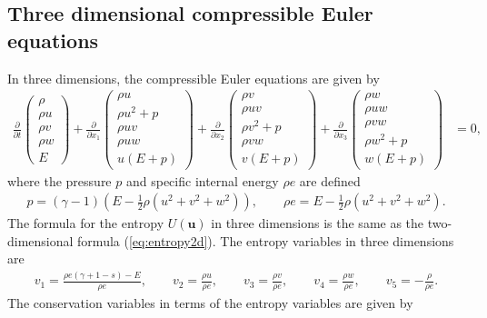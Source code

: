 \documentclass[10pt]{amsart}
\theoremstyle{definition}
\theoremstyle{lemma}
\theoremstyle{theorem}
\theoremstyle{assumption}
\newcommand{\pd}[2]{\frac{\partial#1}{\partial#2}}
\newcommand{\LRp}[1]{\left( #1 \right)}
\begin{document}
{\subsection{Three dimensional compressible Euler equations}

In three dimensions, the compressible Euler equations are given by
\begin{align}
\pd{}{t}\LRp{\begin{array}{c}
\rho\\
\rho u\\
\rho v\\
\rho w\\
E
\end{array}} +
\pd{}{x_1}\LRp{\begin{array}{c}
\rho u\\
\rho u^2+p\\
\rho uv\\
\rho uw\\
u(E+p)
\end{array}} + \pd{}{x_2}\LRp{\begin{array}{c}
\rho v\\
\rho uv\\
\rho v^2+p\\
\rho vw\\
v(E+p)
\end{array}}  + \pd{}{x_3}\LRp{\begin{array}{c}
\rho w\\
\rho uw\\
\rho vw\\
\rho w^2+p\\
w(E+p)
\end{array}} &= 0,
\label{eq:euler3d}
\end{align}
where the pressure $p$ and specific internal energy $\rho e$ are defined 
\begin{align}
p = (\gamma-1)\LRp{E - \frac{1}{2}\rho (u^2+v^2+w^2)}, \qquad \rho e = E - \frac{1}{2}\rho (u^2+v^2+w^2).  
\label{eq:pressure3d}
\end{align}
The formula for the entropy $U(\bm{u})$ in three dimensions is the same as the two-dimensional formula (\ref{eq:entropy2d}).  
 The entropy variables in three dimensions are 
\begin{align}
v_1 = \frac{\rho e (\gamma + 1 - s) - E}{\rho e}, \qquad v_2 = \frac{\rho u}{\rho e}, \qquad v_3 = \frac{\rho v}{\rho e}, \qquad v_4 = \frac{\rho w}{\rho e}, \qquad v_5 = -\frac{\rho}{\rho e}.
\end{align}
The conservation variables in terms of the entropy variables are given by
}
\end{document}
